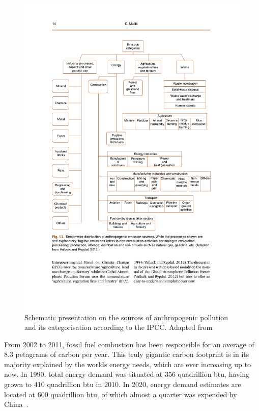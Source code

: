 \begin{figure}[htpb]
    \centering
    \includegraphics[clip,%
        trim=2.3cm 7.3cm 2.3cm 2.6cm,%
        width=\textwidth]{img/pdf/pollution_sources.pdf}
    \caption{Schematic presentation on the sources of anthropogenic
    pollution and its categorisation according to the IPCC. Adapted
    from~\cite{CABI2019}}
    \label{fig:anthropogenic_pollution_categories}
\end{figure}

From 2002 to 2011, fossil fuel combustion has been responsible for an
average of 8.3 petagrams of carbon per year. This truly gigantic carbon
footprint is in its majority explained by the worlds energy needs, which
are ever increasing up to now. In 1990, total energy demand was situated
at 356 quadrillion \gls{btu}, having grown to 410 quadrillion \gls{btu}
in 2010. In 2020, energy demand estimates are located at 600 quadrillion
\gls{btu}, of which almost a quarter was expended by
China~\cite{CABI2019}.

